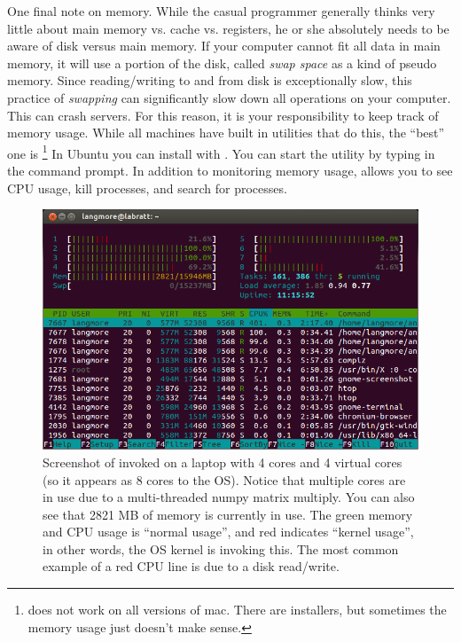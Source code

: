 One final note on memory.  While the casual programmer generally thinks very little about main memory vs. cache vs. registers, he or she absolutely needs to be aware of disk versus main memory.  If your computer cannot fit all data in main memory, it will use a portion of the disk, called \emph{swap space} as a kind of pseudo memory.  Since reading/writing to and from disk is exceptionally slow, this practice of \emph{swapping} can significantly slow down all operations on your computer.  This can crash servers.  For this reason, it is your responsibility to keep track of memory usage.  While all machines have built in utilities that do this, the ``best'' one is \footnote{ does not work on all versions of mac.  There are  installers, but sometimes the memory usage just doesn't make sense.}  In Ubuntu you can install with .  You can start the utility by typing  in the command prompt.  In addition to monitoring memory usage,  allows you to see CPU usage, kill processes, and search for processes.

\begin{figure}
  \includegraphics[width=\textwidth, clip=True, trim=0 100 0 0]{../images/htop}
  \caption{Screenshot of  invoked on a laptop with 4 cores and 4 virtual cores (so it appears as 8 cores to the OS).  Notice that multiple cores are in use due to a multi-threaded numpy matrix multiply.  You can also see that 2821 MB of memory is currently in use.  The green memory and CPU usage is ``normal usage'', and red indicates ``kernel usage'', in other words, the OS kernel is invoking this.  The most common example of a red CPU line is due to a disk read/write.}
  \label{performance:fig:htop}
\end{figure}

